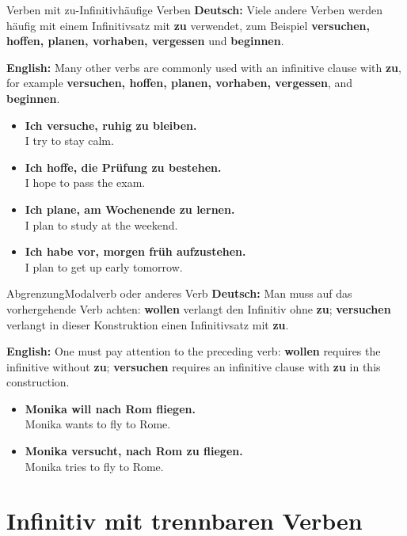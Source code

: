 \documentclass[a4paper,11pt]{article}
\newcommand{\GermanText}[1]{\textbf{Deutsch: }#1\par}
\newcommand{\EnglishText}[1]{{\small\color{SoftGray}\textbf{English: }#1\par}}
\newcommand{\ExampleItem}[2]{\item \textbf{#1}\\{\small\color{SoftGray}#2}}
\begin{document}
        \begin{grammarentry}{Verben mit zu-Infinitiv}{häufige Verben}
            \GermanText{Viele andere Verben werden häufig mit einem Infinitivsatz mit \textbf{zu} verwendet, zum Beispiel \textbf{versuchen, hoffen, planen, vorhaben, vergessen} und \textbf{beginnen}.}
            \EnglishText{Many other verbs are commonly used with an infinitive clause with \textbf{zu}, for example \textbf{versuchen, hoffen, planen, vorhaben, vergessen}, and \textbf{beginnen}.}
        \end{grammarentry}

        \begin{exbox}
            \begin{itemize}
                \ExampleItem{Ich versuche, ruhig zu bleiben.}{I try to stay calm.}
                \ExampleItem{Ich hoffe, die Prüfung zu bestehen.}{I hope to pass the exam.}
                \ExampleItem{Ich plane, am Wochenende zu lernen.}{I plan to study at the weekend.}
                \ExampleItem{Ich habe vor, morgen früh aufzustehen.}{I plan to get up early tomorrow.}
            \end{itemize}
        \end{exbox}

        \begin{grammarentry}{Abgrenzung}{Modalverb oder anderes Verb}
            \GermanText{Man muss auf das vorhergehende Verb achten: \textbf{wollen} verlangt den Infinitiv ohne \textbf{zu}; \textbf{versuchen} verlangt in dieser Konstruktion einen Infinitivsatz mit \textbf{zu}.}
            \EnglishText{One must pay attention to the preceding verb: \textbf{wollen} requires the infinitive without \textbf{zu}; \textbf{versuchen} requires an infinitive clause with \textbf{zu} in this construction.}
        \end{grammarentry}

        \begin{exbox}
            \begin{itemize}
                \ExampleItem{Monika will nach Rom fliegen.}{Monika wants to fly to Rome.}
                \ExampleItem{Monika versucht, nach Rom zu fliegen.}{Monika tries to fly to Rome.}
            \end{itemize}
        \end{exbox}


    \section{Infinitiv mit trennbaren Verben}
\end{document}
